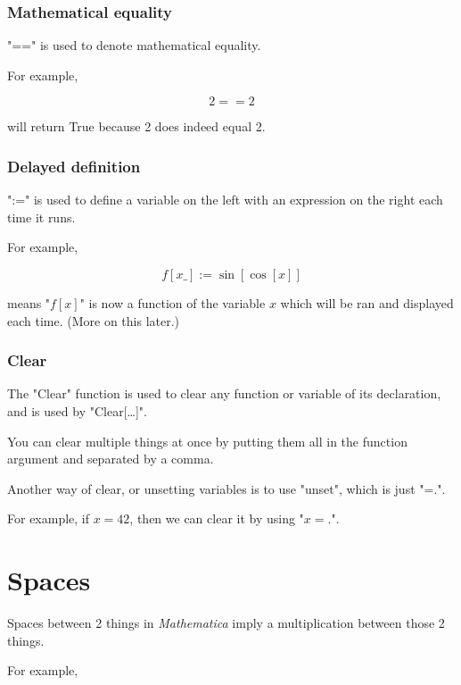 \documentclass[11pt,a4paper,twoside]{article}
\begin{document}
					\subsubsection{Mathematical equality} %
					
						"==" is used to denote mathematical equality.
						
						For example,
						
						\[ 2 == 2 \]
							
						will return True because 2 does indeed equal 2.
					
						
					\subsubsection{Delayed definition}
							
						":=" is used to define a variable on the left with an expression on the right each time it runs.
						
						For example, 
						
						\[ f[x\_]:= \sin[\cos[x]] \]
						
						means "$f[x]$" is now a function of the variable $x$ which will be ran and displayed each time.  (More on this later.)
							
					\subsubsection{Clear}
						
						The "Clear" function is used to clear any function or variable of its declaration, and is used by "Clear[\dots]".
						
						You can clear multiple things at once by putting them all in the function argument and separated by a comma.
						
						Another way of clear, or unsetting variables is to use "unset", which is just "=.".  
						
						For example, if $ x = 42 $, then we can clear it by using "$x=.$".
	
		\section{Spaces}
						
			Spaces between 2 things in \textit{Mathematica} imply a multiplication between those 2 things.
						
			For example,
						
\end{document}

